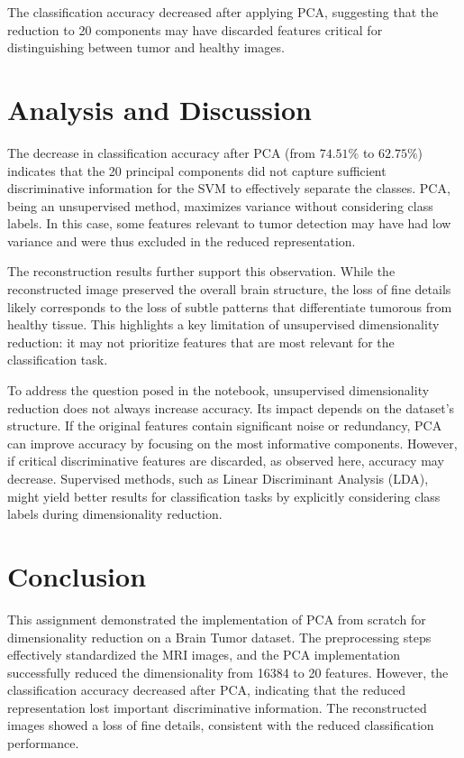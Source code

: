 \documentclass{article}
\begin{document}
The classification accuracy decreased after applying PCA, suggesting that the reduction to 20 components may have discarded features critical for distinguishing between tumor and healthy images.

\section*{Analysis and Discussion}

The decrease in classification accuracy after PCA (from $74.51\%$ to $62.75\%$) indicates that the 20 principal components did not capture sufficient discriminative information for the SVM to effectively separate the classes. PCA, being an unsupervised method, maximizes variance without considering class labels. In this case, some features relevant to tumor detection may have had low variance and were thus excluded in the reduced representation.

The reconstruction results further support this observation. While the reconstructed image preserved the overall brain structure, the loss of fine details likely corresponds to the loss of subtle patterns that differentiate tumorous from healthy tissue. This highlights a key limitation of unsupervised dimensionality reduction: it may not prioritize features that are most relevant for the classification task.

To address the question posed in the notebook, unsupervised dimensionality reduction does not always increase accuracy. Its impact depends on the dataset's structure. If the original features contain significant noise or redundancy, PCA can improve accuracy by focusing on the most informative components. However, if critical discriminative features are discarded, as observed here, accuracy may decrease. Supervised methods, such as Linear Discriminant Analysis (LDA), might yield better results for classification tasks by explicitly considering class labels during dimensionality reduction.

\section*{Conclusion}

This assignment demonstrated the implementation of PCA from scratch for dimensionality reduction on a Brain Tumor dataset. The preprocessing steps effectively standardized the MRI images, and the PCA implementation successfully reduced the dimensionality from 16384 to 20 features. However, the classification accuracy decreased after PCA, indicating that the reduced representation lost important discriminative information. The reconstructed images showed a loss of fine details, consistent with the reduced classification performance.
\end{document}
